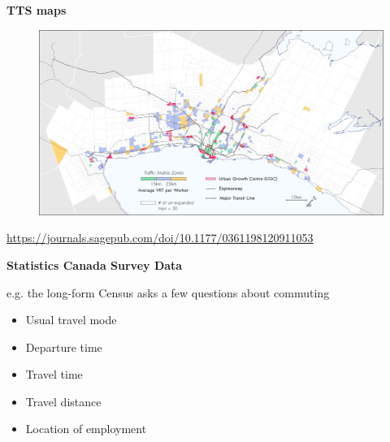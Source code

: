 \documentclass[aspectratio=169]{beamer}
\begin{document}
\begin{frame}
	
	\textbf{TTS maps}
	
	\begin{figure}
		\centering
		\includegraphics[width=1\linewidth]{images/vkt_map_7.png}
	\end{figure}

	\tiny\url{https://journals.sagepub.com/doi/10.1177/0361198120911053}
	
\end{frame}



\begin{frame}
	
	\textbf{Statistics Canada Survey Data}
	
	\vspace{2mm}
	
	e.g. the long-form Census asks a few questions about commuting
	
	\begin{itemize}
		\item Usual travel mode
		\item Departure time
		\item Travel time
		\item Travel distance
		\item Location of employment
	\end{itemize}
	
\end{frame}
\end{document}
